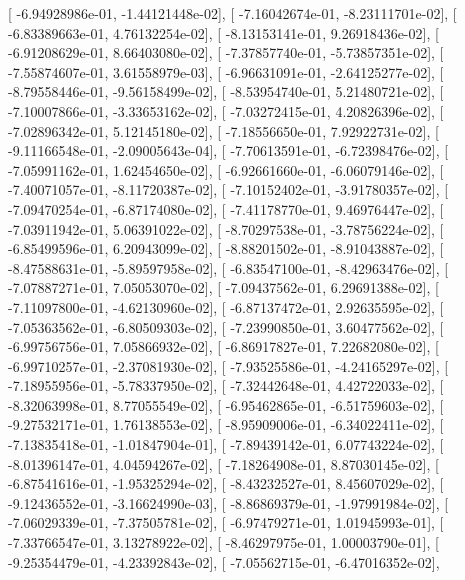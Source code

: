 \documentclass{article}
\begin{document}
       [ -6.94928986e-01,  -1.44121448e-02],
       [ -7.16042674e-01,  -8.23111701e-02],
       [ -6.83389663e-01,   4.76132254e-02],
       [ -8.13153141e-01,   9.26918436e-02],
       [ -6.91208629e-01,   8.66403080e-02],
       [ -7.37857740e-01,  -5.73857351e-02],
       [ -7.55874607e-01,   3.61558979e-03],
       [ -6.96631091e-01,  -2.64125277e-02],
       [ -8.79558446e-01,  -9.56158499e-02],
       [ -8.53954740e-01,   5.21480721e-02],
       [ -7.10007866e-01,  -3.33653162e-02],
       [ -7.03272415e-01,   4.20826396e-02],
       [ -7.02896342e-01,   5.12145180e-02],
       [ -7.18556650e-01,   7.92922731e-02],
       [ -9.11166548e-01,  -2.09005643e-04],
       [ -7.70613591e-01,  -6.72398476e-02],
       [ -7.05991162e-01,   1.62454650e-02],
       [ -6.92661660e-01,  -6.06079146e-02],
       [ -7.40071057e-01,  -8.11720387e-02],
       [ -7.10152402e-01,  -3.91780357e-02],
       [ -7.09470254e-01,  -6.87174080e-02],
       [ -7.41178770e-01,   9.46976447e-02],
       [ -7.03911942e-01,   5.06391022e-02],
       [ -8.70297538e-01,  -3.78756224e-02],
       [ -6.85499596e-01,   6.20943099e-02],
       [ -8.88201502e-01,  -8.91043887e-02],
       [ -8.47588631e-01,  -5.89597958e-02],
       [ -6.83547100e-01,  -8.42963476e-02],
       [ -7.07887271e-01,   7.05053070e-02],
       [ -7.09437562e-01,   6.29691388e-02],
       [ -7.11097800e-01,  -4.62130960e-02],
       [ -6.87137472e-01,   2.92635595e-02],
       [ -7.05363562e-01,  -6.80509303e-02],
       [ -7.23990850e-01,   3.60477562e-02],
       [ -6.99756756e-01,   7.05866932e-02],
       [ -6.86917827e-01,   7.22682080e-02],
       [ -6.99710257e-01,  -2.37081930e-02],
       [ -7.93525586e-01,  -4.24165297e-02],
       [ -7.18955956e-01,  -5.78337950e-02],
       [ -7.32442648e-01,   4.42722033e-02],
       [ -8.32063998e-01,   8.77055549e-02],
       [ -6.95462865e-01,  -6.51759603e-02],
       [ -9.27532171e-01,   1.76138553e-02],
       [ -8.95909006e-01,  -6.34022411e-02],
       [ -7.13835418e-01,  -1.01847904e-01],
       [ -7.89439142e-01,   6.07743224e-02],
       [ -8.01396147e-01,   4.04594267e-02],
       [ -7.18264908e-01,   8.87030145e-02],
       [ -6.87541616e-01,  -1.95325294e-02],
       [ -8.43232527e-01,   8.45607029e-02],
       [ -9.12436552e-01,  -3.16624990e-03],
       [ -8.86869379e-01,  -1.97991984e-02],
       [ -7.06029339e-01,  -7.37505781e-02],
       [ -6.97479271e-01,   1.01945993e-01],
       [ -7.33766547e-01,   3.13278922e-02],
       [ -8.46297975e-01,   1.00003790e-01],
       [ -9.25354479e-01,  -4.23392843e-02],
       [ -7.05562715e-01,  -6.47016352e-02],
\end{document}
